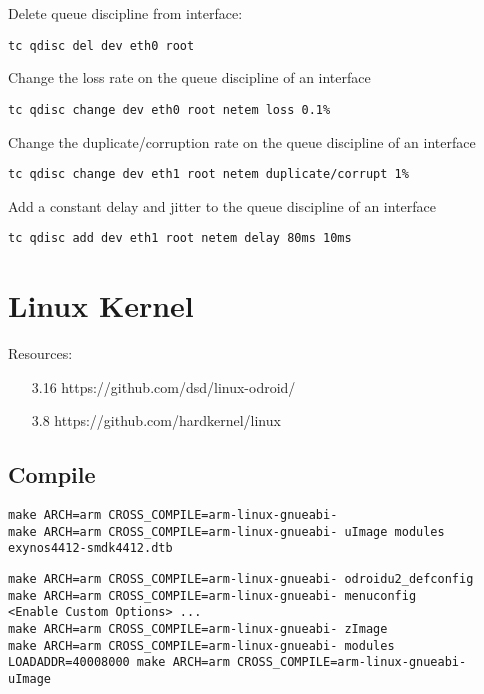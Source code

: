 \noindent
Delete queue discipline from interface:
\begin{lstlisting}
tc qdisc del dev eth0 root
\end{lstlisting}

\noindent
Change the loss rate on the queue discipline of an interface
\begin{lstlisting}
tc qdisc change dev eth0 root netem loss 0.1%
\end{lstlisting}

\noindent
Change the duplicate/corruption rate on the queue discipline of an interface
\begin{lstlisting}
tc qdisc change dev eth1 root netem duplicate/corrupt 1%
\end{lstlisting}

\noindent
Add a constant delay and jitter to the queue discipline of an interface
\begin{lstlisting}
tc qdisc add dev eth1 root netem delay 80ms 10ms
\end{lstlisting}


\section{Linux Kernel}

Resources:
\begin{itemize}
 \item [3.16] https://github.com/dsd/linux-odroid/
 \item [3.8] https://github.com/hardkernel/linux
\end{itemize}

\subsection{Compile}

\begin{lstlisting}
make ARCH=arm CROSS_COMPILE=arm-linux-gnueabi- 
make ARCH=arm CROSS_COMPILE=arm-linux-gnueabi- uImage modules exynos4412-smdk4412.dtb
\end{lstlisting}

\begin{lstlisting}
make ARCH=arm CROSS_COMPILE=arm-linux-gnueabi- odroidu2_defconfig
make ARCH=arm CROSS_COMPILE=arm-linux-gnueabi- menuconfig
<Enable Custom Options> ...
make ARCH=arm CROSS_COMPILE=arm-linux-gnueabi- zImage
make ARCH=arm CROSS_COMPILE=arm-linux-gnueabi- modules
LOADADDR=40008000 make ARCH=arm CROSS_COMPILE=arm-linux-gnueabi- uImage
\end{lstlisting}

